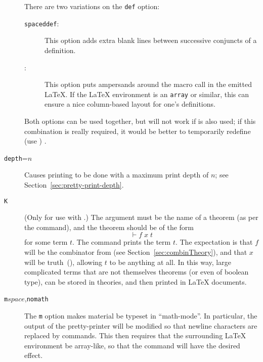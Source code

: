 \begin{description}
There are two variations on the \texttt{def} option:
\begin{description}
\item[\texttt{spaceddef}:]%
%
This option adds extra blank lines between successive conjuncts of a definition.
\item[:]%
%
This option puts ampersands around the  macro call in the emitted \LaTeX{}.
If the \LaTeX{} environment is an \texttt{array} or similar, this can ensure a nice column-based layout for one's definitions.
\end{description}
Both options can be used together, but  will not work if  is also used; if this combination is really required, it would be better to temporarily redefine (use ) .


\item[\texttt{depth}=$n$]
Causes printing to be done with a maximum print depth of $n$; see Section~\ref{sec:pretty-print-depth}.

\item[\texttt{K}] (Only for use with \holtm.)
%
The argument must be the name of a theorem (as per the \holthm{} command), and the theorem should be of the form
\[
\vdash f\;x\;t
\]
for some term $t$.
%
The command prints the term $t$.
%
%
%
The expectation is that $f$ will be the combinator  from  (see Section~\ref{sec:combinTheory}), and that $x$ will be truth~(), allowing $t$ to be anything at all.
%
In this way, large complicated terms that are not themselves theorems (or even of boolean type), can be stored in \HOL{} theories, and then printed in \LaTeX{} documents.

\item[\texttt{m}$\mathit{space}$,\texttt{nomath}] The \texttt{m} option makes \HOL{} material be typeset in ``math-mode''.
In particular, the output of the pretty-printer will be modified so that newline characters are replaced by \texttt{\bs\bs} commands.
This then requires that the surrounding \LaTeX{} environment be array-like, so that the \texttt{\bs\bs} command will have the desired effect.


\end{description}
